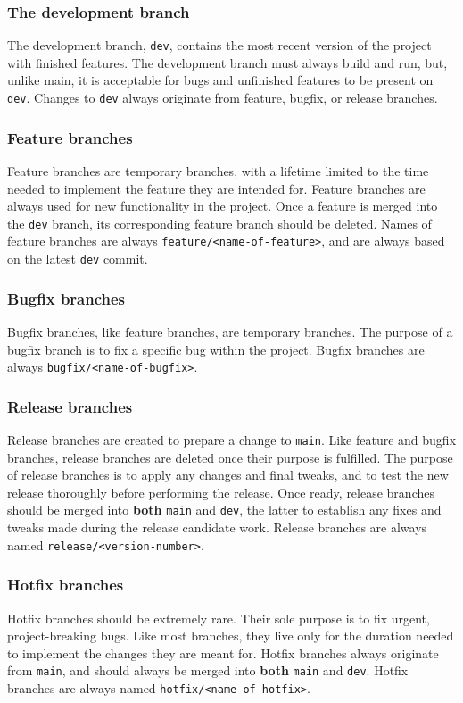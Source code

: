 \documentclass[12pt,a4paper]{article}
\begin{document}
        \subsubsection{The development branch}
            The development branch, \verb|dev|, contains the most recent version of the project with finished features. The development branch must always build and run, but, unlike main, it is acceptable for bugs and unfinished features to be present on \verb|dev|. Changes to \verb|dev| always originate from feature, bugfix, or release branches.
        
        \subsubsection{Feature branches}
            Feature branches are temporary branches, with a lifetime limited to the time needed to implement the feature they are intended for. Feature branches are always used for new functionality in the project. Once a feature is merged into the \verb|dev| branch, its corresponding feature branch should be deleted. Names of feature branches are always \verb|feature/<name-of-feature>|, and are always based on the latest \verb|dev| commit.
        
        \subsubsection{Bugfix branches}
            Bugfix branches, like feature branches, are temporary branches. The purpose of a bugfix branch is to fix a specific bug within the project. Bugfix branches are always \verb|bugfix/<name-of-bugfix>|.
        
        \subsubsection{Release branches}
            Release branches are created to prepare a change to \verb|main|. Like feature and bugfix branches, release branches are deleted once their purpose is fulfilled. The purpose of release branches is to apply any changes and final tweaks, and to test the new release thoroughly before performing the release. Once ready, release branches should be merged into \textbf{both} \verb|main| and \verb|dev|, the latter to establish any fixes and tweaks made during the release candidate work. Release branches are always named \verb|release/<version-number>|.
        
        \subsubsection{Hotfix branches}
            Hotfix branches should be extremely rare. Their sole purpose is to fix urgent, project-breaking bugs. Like most branches, they live only for the duration needed to implement the changes they are meant for. Hotfix branches always originate from \verb|main|, and should always be merged into \textbf{both} \verb|main| and \verb|dev|. Hotfix branches are always named \verb|hotfix/<name-of-hotfix>|.
\end{document}
